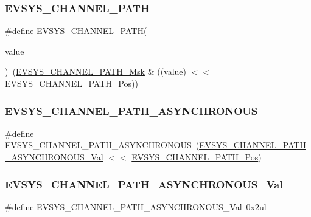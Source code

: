 \subsubsection{\texorpdfstring{EVSYS\_CHANNEL\_PATH}{EVSYS\_CHANNEL\_PATH}}
{\footnotesize\ttfamily \#define E\+V\+S\+Y\+S\+\_\+\+C\+H\+A\+N\+N\+E\+L\+\_\+\+P\+A\+TH(\begin{DoxyParamCaption}\item[{}]{value }\end{DoxyParamCaption})~(\mbox{\hyperlink{group___s_a_m_d21___e_v_s_y_s_ga8b3ef7a0b4006e53d02e028a7357290d}{E\+V\+S\+Y\+S\+\_\+\+C\+H\+A\+N\+N\+E\+L\+\_\+\+P\+A\+T\+H\+\_\+\+Msk}} \& ((value) $<$$<$ \mbox{\hyperlink{group___s_a_m_d21___e_v_s_y_s_ga1c99b6755155dc2b405c63587973570b}{E\+V\+S\+Y\+S\+\_\+\+C\+H\+A\+N\+N\+E\+L\+\_\+\+P\+A\+T\+H\+\_\+\+Pos}}))}

\mbox{\label{group___s_a_m_d21___e_v_s_y_s_ga6bc286e48c7fe4e5281967d955a29968}} 
\subsubsection{\texorpdfstring{EVSYS\_CHANNEL\_PATH\_ASYNCHRONOUS}{EVSYS\_CHANNEL\_PATH\_ASYNCHRONOUS}}
{\footnotesize\ttfamily \#define E\+V\+S\+Y\+S\+\_\+\+C\+H\+A\+N\+N\+E\+L\+\_\+\+P\+A\+T\+H\+\_\+\+A\+S\+Y\+N\+C\+H\+R\+O\+N\+O\+US~(\mbox{\hyperlink{group___s_a_m_d21___e_v_s_y_s_gae66529525c793ce0b4621730bd6d5944}{E\+V\+S\+Y\+S\+\_\+\+C\+H\+A\+N\+N\+E\+L\+\_\+\+P\+A\+T\+H\+\_\+\+A\+S\+Y\+N\+C\+H\+R\+O\+N\+O\+U\+S\+\_\+\+Val}} $<$$<$ \mbox{\hyperlink{group___s_a_m_d21___e_v_s_y_s_ga1c99b6755155dc2b405c63587973570b}{E\+V\+S\+Y\+S\+\_\+\+C\+H\+A\+N\+N\+E\+L\+\_\+\+P\+A\+T\+H\+\_\+\+Pos}})}

\mbox{\label{group___s_a_m_d21___e_v_s_y_s_gae66529525c793ce0b4621730bd6d5944}} 
\subsubsection{\texorpdfstring{EVSYS\_CHANNEL\_PATH\_ASYNCHRONOUS\_Val}{EVSYS\_CHANNEL\_PATH\_ASYNCHRONOUS\_Val}}
{\footnotesize\ttfamily \#define E\+V\+S\+Y\+S\+\_\+\+C\+H\+A\+N\+N\+E\+L\+\_\+\+P\+A\+T\+H\+\_\+\+A\+S\+Y\+N\+C\+H\+R\+O\+N\+O\+U\+S\+\_\+\+Val~0x2ul}



